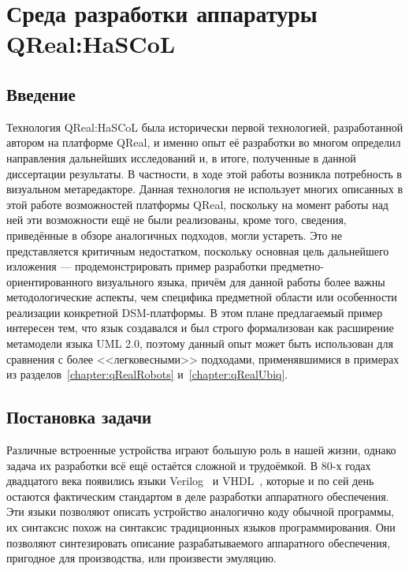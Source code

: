 \section{Среда разработки аппаратуры QReal:HaSCoL}
\label{chapter:qRealHascol}

\subsection{Введение}
Технология QReal:HaSCoL была исторически первой технологией, разработанной автором 
на платформе QReal, и именно опыт её разработки во многом определил направления дальнейших 
исследований и, в итоге, полученные в данной диссертации результаты. В частности, 
в ходе этой работы возникла потребность в визуальном метаредакторе. Данная технология 
не использует многих описанных в этой работе возможностей платформы QReal, поскольку 
на момент работы над ней эти возможности ещё не были реализованы, кроме того, сведения, 
приведённые в обзоре аналогичных подходов, могли устареть. Это не представляется критичным 
недостатком, поскольку основная цель дальнейшего изложения --- продемонстрировать 
пример разработки предметно-ориентированного визуального языка, причём для данной 
работы более важны методологические аспекты, чем специфика предметной области или особенности реализации конкретной \ac{DSM}-платформы. 
В этом плане предлагаемый пример интересен тем, что язык создавался и был строго формализован как расширение метамодели 
языка UML 2.0, поэтому данный опыт может быть использован для сравнения с более <<легковесными>> 
подходами, применявшимися в примерах из разделов~\ref{chapter:qRealRobots} и~\ref{chapter:qRealUbiq}.

\subsection{Постановка задачи}
Различные встроенные устройства играют большую роль в нашей жизни, однако задача их 
разработки всё ещё остаётся сложной и трудоёмкой. В 80-х годах двадцатого века появились языки 
Verilog~\cite{verilog} и VHDL~\cite{vhdl}, которые и по сей день остаются фактическим стандартом в деле разработки аппаратного 
обеспечения. Эти языки позволяют описать устройство аналогично коду обычной программы, 
их синтаксис похож на синтаксис традиционных языков программирования. Они позволяют 
синтезировать описание разрабатываемого аппаратного обеспечения, пригодное для производства, 
или произвести эмуляцию.

